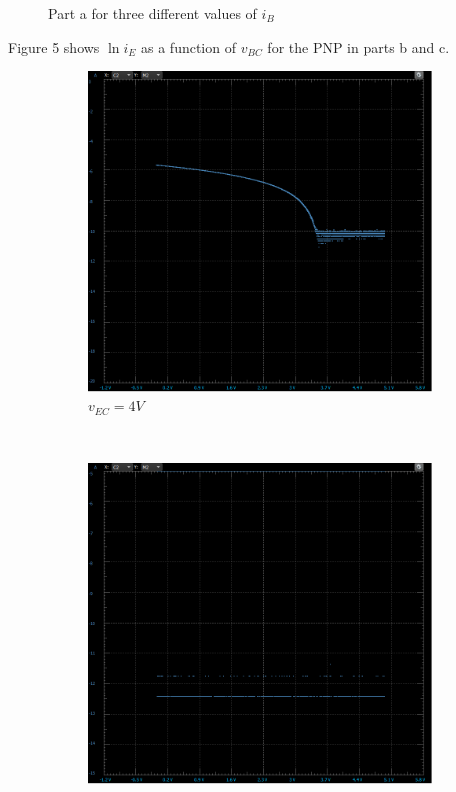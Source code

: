 \documentclass[12pt]{article}
\begin{document}
\begin{enumerate}
\begin{enumerate}
\begin{figure}[h!]
\begin{subfigure}[b]{0.31\textwidth}
            \end{subfigure}
            \caption{Part a for three different values of $i_B$}
        \end{figure} \newpage
        Figure 5 shows $\ln i_E$ as a function of $v_{BC}$ for the PNP in parts b and c. \\
        \begin{figure}[h!]
            \centering
            \begin{subfigure}[b]{0.48\textwidth}
                \includegraphics[width=\textwidth]{PBC4.png}
                \caption{$v_{EC} = 4V$}
            \end{subfigure}
            ~
            \begin{subfigure}[b]{0.48\textwidth}
                \includegraphics[width=\textwidth]{PCC02.png}

\end{subfigure}
\end{figure}
\end{enumerate}
\end{enumerate}
\end{document}
